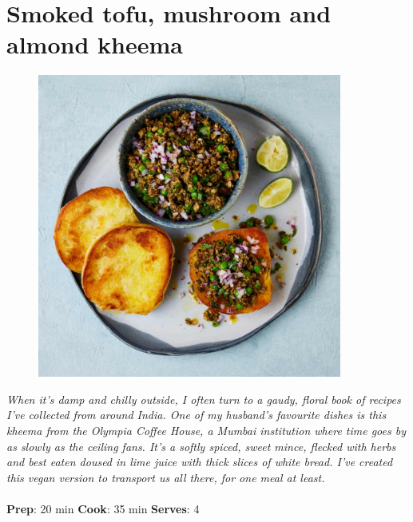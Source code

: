 \documentclass{book}
\begin{document}
\section{Smoked tofu, mushroom and almond kheema}
\begin{figure}
\centering\includegraphics[width=10cm,height=10cm,keepaspectratio]{Recipe_Pictures/Smoked_tofu,_mushroom_and_almond_kheema.png}
\end{figure}
\emph{When it’s damp and chilly outside, I often turn to a gaudy, floral book of recipes I’ve collected from around India. One of my husband’s favourite dishes is this kheema from the Olympia Coffee House, a Mumbai institution where time goes by as slowly as the ceiling fans. It’s a softly spiced, sweet mince, flecked with herbs and best eaten doused in lime juice with thick slices of white bread. I’ve created this vegan version to transport us all there, for one meal at least.}\\\\ 
\textbf{Prep}: 20 min
\textbf{Cook}: 35 min
\textbf{Serves}: 4
\end{document}
